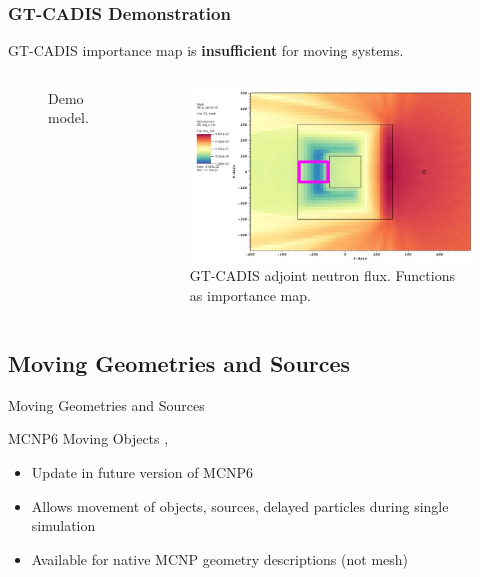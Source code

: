 \documentclass{beamer}
\begin{document}
\begin{frame}
\frametitle{GT-CADIS Demonstration}
	GT-CADIS importance map is \textbf{insufficient} for moving systems.

	\begin{columns}
        \begin{figure}
	\vspace{-0.9cm}
		\hspace{-1cm}
		\caption{Demo model.}
        \end{figure}

        \begin{figure}
	\centering
	\includegraphics[scale=0.20]{gtcadis_adjn_hi.jpg}
		\caption{GT-CADIS adjoint neutron flux. Functions as importance
		map.}
	\end{figure}
	\end{columns}

\end{frame}



\subsection{Moving Geometries and Sources}
\begin{frame}{Moving Geometries and Sources}
	\begin{block}{MCNP6 Moving Objects \cite{mcnp_moving_1},
		\cite{mcnp_moving_2}}
	\begin{itemize}
		\item{Update in future version of MCNP6}
		\item{Allows movement of objects, sources, delayed particles
			during single simulation}
		\item{Available for native MCNP geometry descriptions (not
			mesh)}
	\end{itemize}
	\end{block}
\end{frame}
\end{document}
